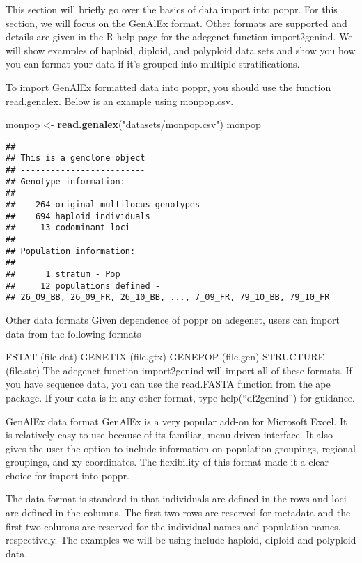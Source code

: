 \documentclass[12pt,]{krantz}
\newenvironment{Shaded}{\begin{snugshade}}{\end{snugshade}}
\newcommand{\KeywordTok}[1]{\textcolor[rgb]{0.27,0.27,0.27}{\textbf{#1}}}
\newcommand{\StringTok}[1]{\textcolor[rgb]{0.5,0.5,0.5}{#1}}
\newcommand{\NormalTok}[1]{#1}
\theoremstyle{definition}
\theoremstyle{definition}
\theoremstyle{definition}
\theoremstyle{remark}
\begin{document}
This section will briefly go over the basics of data import into poppr.
For this section, we will focus on the GenAlEx format. Other formats are
supported and details are given in the R help page for the adegenet
function import2genind. We will show examples of haploid, diploid, and
polyploid data sets and show you how you can format your data if it's
grouped into multiple stratifications.

To import GenAlEx formatted data into poppr, you should use the function
read.genalex. Below is an example using monpop.csv.

\begin{Shaded}
\begin{Highlighting}[]
\NormalTok{monpop <-}\StringTok{ }\KeywordTok{read.genalex}\NormalTok{(}\StringTok{"datasets/monpop.csv"}\NormalTok{)}
\NormalTok{monpop}
\end{Highlighting}
\end{Shaded}

\begin{verbatim}
## 
## This is a genclone object
## -------------------------
## Genotype information:
## 
##    264 original multilocus genotypes 
##    694 haploid individuals
##     13 codominant loci
## 
## Population information:
## 
##      1 stratum - Pop
##     12 populations defined - 
## 26_09_BB, 26_09_FR, 26_10_BB, ..., 7_09_FR, 79_10_BB, 79_10_FR
\end{verbatim}

Other data formats Given dependence of poppr on adegenet, users can
import data from the following formats

FSTAT (file.dat) GENETIX (file.gtx) GENEPOP (file.gen) STRUCTURE
(file.str) The adegenet function import2genind will import all of these
formats. If you have sequence data, you can use the read.FASTA function
from the ape package. If your data is in any other format, type
help(``df2genind'') for guidance.

GenAlEx data format GenAlEx is a very popular add-on for Microsoft
Excel. It is relatively easy to use because of its familiar, menu-driven
interface. It also gives the user the option to include information on
population groupings, regional groupings, and xy coordinates. The
flexibility of this format made it a clear choice for import into poppr.

The data format is standard in that individuals are defined in the rows
and loci are defined in the columns. The first two rows are reserved for
metadata and the first two columns are reserved for the individual names
and population names, respectively. The examples we will be using
include haploid, diploid and polyploid data.
\end{document}
